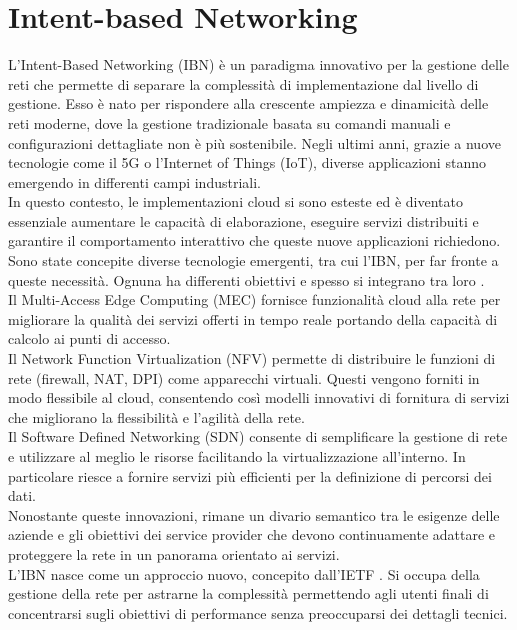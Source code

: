 \section{Intent-based Networking}
\label{ch:IBN}
L'Intent-Based Networking (IBN) è un paradigma innovativo per la gestione delle reti che permette di separare la complessità di implementazione dal livello di gestione.
Esso è nato per rispondere alla crescente ampiezza e dinamicità delle reti moderne, dove la gestione tradizionale basata su comandi manuali e configurazioni dettagliate non è più sostenibile.
Negli ultimi anni, grazie a nuove tecnologie come il 5G o l'Internet of Things (IoT), diverse applicazioni stanno emergendo in differenti campi industriali.
\\In questo contesto, le implementazioni cloud si sono esteste ed è diventato essenziale aumentare le capacità di elaborazione, eseguire servizi distribuiti e garantire il 
comportamento interattivo che queste nuove applicazioni richiedono.
Sono state concepite diverse tecnologie emergenti, tra cui l'IBN, per far fronte a queste necessità. Ognuna ha differenti obiettivi e spesso si integrano tra loro \cite{ibn}.
\\Il Multi-Access Edge Computing\cite{mec} (MEC) fornisce funzionalità cloud alla rete per migliorare la qualità dei servizi offerti in tempo reale portando della capacità di calcolo ai punti di accesso.
\\Il Network Function Virtualization\cite{nfv} (NFV) permette di distribuire le funzioni di rete (firewall, NAT, DPI) come apparecchi virtuali. Questi vengono forniti in modo flessibile al cloud, consentendo 
così modelli innovativi di fornitura di servizi che migliorano la flessibilità e l'agilità della rete.
\\Il Software Defined Networking (SDN) consente di semplificare la gestione di rete e utilizzare al meglio le risorse facilitando la virtualizzazione all'interno. In particolare riesce a 
fornire servizi più efficienti per la definizione di percorsi dei dati.
\\Nonostante queste innovazioni, rimane un divario semantico tra le esigenze delle aziende e gli obiettivi dei service provider che devono continuamente adattare e proteggere la rete in un panorama orientato ai servizi.
\\L'IBN nasce come un approccio nuovo, concepito dall'IETF \cite{ietf}. Si occupa della gestione della rete per astrarne la complessità permettendo agli utenti finali di concentrarsi sugli obiettivi di performance senza preoccuparsi dei dettagli tecnici.
